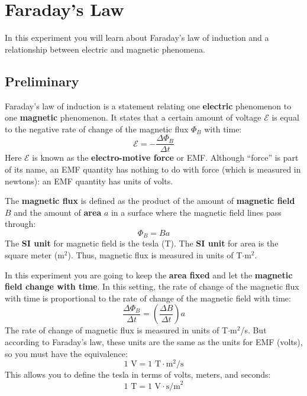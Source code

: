 \setcounter{chapter}{3}
\chapter{Faraday's Law}
%
In this experiment you will learn about Faraday's law of induction and a relationship between electric and magnetic phenomena.
%
\section{Preliminary}
%
Faraday's law of induction is a statement relating one \textbf{electric} phenomenon to one \textbf{magnetic} phenomenon. It states that a certain amount of voltage $\mathcal{E}$ is equal to the negative rate of change of the magnetic flux $\Phi_{B}$ with time:
\begin{equation}
	\mathcal{E} = -\frac{\Delta \Phi_{B}}{\Delta t}
	\label{eq.04.faradays.law}
\end{equation}
Here $\mathcal{E}$ is known as the \textbf{electro-motive force} or EMF. Although ``force'' is part of its name, an EMF quantity has nothing to do with force (which is measured in newtons): an EMF quantity has units of volts.

The \textbf{magnetic flux} is defined as the product of the amount of \textbf{magnetic field} $B$ and the amount of \textbf{area} $a$ in a surface where the magnetic field lines pass through:
\begin{equation}
	\Phi_{B} = B a
\end{equation}
The \textbf{SI unit} for magnetic field is the tesla (T). The \textbf{SI unit} for area is the square meter (m$^{2}$). Thus, magnetic flux is measured in units of T$\cdot$m$^{2}$.

In this experiment you are going to keep the \textbf{area fixed} and let the \textbf{magnetic field change with time}. In this setting, the rate of change of the magnetic flux with time is proportional to the rate of change of the magnetic field with time:
\begin{equation}
	\frac{\Delta \Phi_{B}}{\Delta t} = \left(\frac{\Delta B}{\Delta t}\right) a
	\label{eq.04.flux.rate}
\end{equation}
The rate of change of magnetic flux is measured in units of T$\cdot$m$^{2}$/s. But according to Faraday's law, these units are the same as the units for EMF (volts), so you must have the equivalence:
\begin{equation}
	1 \text{ V} = 1 \text{ T} \cdot \text{m}^{2}\text{/s}
\end{equation}
This allows you to define the tesla in terms of volts, meters, and seconds:
\begin{equation}
	1 \text{ T} = 1 \text{ V} \cdot \text{s/m}^2
\end{equation}

